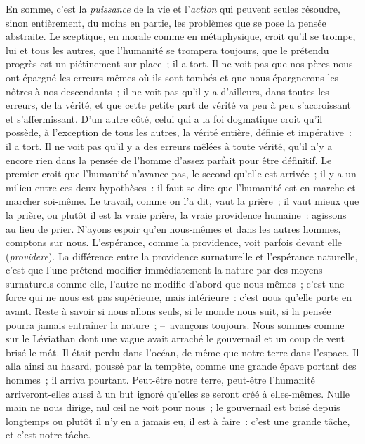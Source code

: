 \documentclass[french,twoside]{book} %
\begin{document}
En somme, c’est la \emph{puissance} de la vie et l’\emph{action} qui peuvent seules résoudre, sinon entièrement, du moins en partie, les problèmes que se pose la pensée abstraite. Le sceptique, en morale comme en métaphysique, croit qu’il se trompe, lui et tous les autres, que l’humanité se trompera toujours, que le prétendu progrès est un piétinement sur place ; il a tort. Il ne voit pas que nos pères nous ont épargné les erreurs mêmes où ils sont tombés et que nous épargnerons les nôtres à nos descendants ; il ne voit pas qu’il y a d’ailleurs, dans toutes les erreurs, de la vérité, et que cette petite part de vérité va peu à peu s’accroissant et s’affermissant. D’un autre côté, celui qui a la foi dogmatique croit qu’il possède, à l’exception de tous les autres, la vérité entière, définie et impérative : il a tort. Il ne voit pas qu’il y a des erreurs mêlées à toute vérité, qu’il n’y a encore rien dans la pensée de l’homme d’assez parfait pour être définitif. Le premier croit que l’humanité n’avance pas, le second qu’elle est arrivée ; il y a un milieu entre ces deux hypothèses : il faut se dire que l’humanité est en marche et marcher soi-même. Le travail, comme on l’a dit, vaut la prière ; il vaut mieux que la prière, ou plutôt il est la vraie prière, la vraie providence humaine : agissons au lieu de prier. N’ayons espoir qu’en nous-mêmes et dans les autres hommes, comptons sur nous. L’espérance, comme la providence, voit parfois devant elle (\emph{providere}). La différence entre la providence surnaturelle et l’espérance naturelle, c’est que l’une prétend modifier immédiatement la nature par des moyens surnaturels comme elle, l’autre ne modifie d’abord que nous-mêmes ; c’est une force qui ne nous est pas supérieure, mais intérieure : c’est nous qu’elle porte en avant. Reste à savoir si nous allons seuls, si le monde nous suit, si la pensée pourra jamais entraîner la nature ; – avançons toujours. Nous sommes comme sur le Léviathan dont une vague avait arraché le gouvernail et un coup de vent brisé le mât. Il était perdu dans l’océan, de même que notre terre dans l’espace. Il alla ainsi au hasard, poussé par la tempête, comme une grande épave portant des hommes ; il arriva pourtant. Peut-être notre terre, peut-être l’humanité arriveront-elles aussi à un but ignoré qu’elles se seront créé à elles-mêmes. Nulle main ne nous dirige, nul œil ne voit pour nous ; le gouvernail est brisé depuis longtemps ou plutôt il n’y en a jamais eu, il est à faire : c’est une grande tâche, et c’est notre tâche.\par
\end{document}
